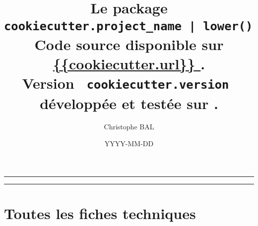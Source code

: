 \documentclass[12pt,a4paper]{article}
\begin{document}
\renewcommand\labelitemi{\raisebox{0.125em}{\tiny\textbullet}}
\renewcommand{\labelitemii}{---}

\title{   %
	Le package \texttt{ {{cookiecutter.project_name | lower()}} }\\%
	{\footnotesize Code source disponible sur \url{ {{cookiecutter.url}} }.}\\%
{\footnotesize Version \texttt{ {{cookiecutter.version}} } développée et testée sur \macosxname{}.}%
}
\author{Christophe BAL}
\date{YYYY-MM-DD}

\maketitle


\vspace{2em}

\hrule

\tableofcontents

\vspace{1.5em}

\hrule

\newpage



\newpage
\section{Toutes les fiches techniques} \label{techincal-ids}

\end{document}

